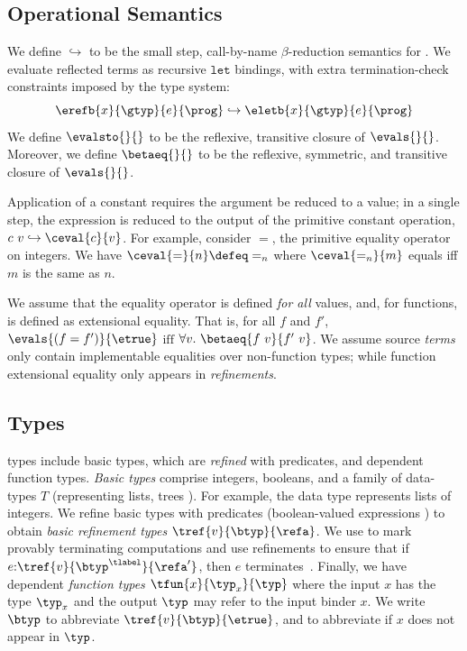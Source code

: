 \subsection{Operational Semantics}
We define $\hookrightarrow$ to be the small step, call-by-name
$\beta$-reduction semantics for \corelan.
%
We evaluate reflected terms %
as recursive $\mathtt{let}$ bindings, with extra termination-check
constraints imposed by the type system:
%
$$
\erefb{x}{\gtyp}{e}{\prog}
\hookrightarrow
\eletb{x}{\gtyp}{e}{\prog}
$$
%
We define $\evalsto{}{}$ to be the reflexive,
transitive closure of $\evals{}{}$.
%
Moreover, we define $\betaeq{}{}$ to be the reflexive,
symmetric, and transitive closure of $\evals{}{}$.

 Application of a constant requires the
argument be reduced to a value; in a single step, the
expression is reduced to the output of the primitive
constant operation, \ie ${c\ v} \hookrightarrow \ceval{c}{v}$.
%
For example, consider $=$, the primitive equality
operator on integers.
%
We have $\ceval{=}{n} \defeq =_n$
where $\ceval{=_n}{m}$ equals \etrue
iff $m$ is the same as $n$.
%

We assume that the equality operator
is defined \emph{for all} values,
and, for functions, is defined as
extensional equality.
%
That is, for all
$f$ and
$f'$,
$\evals{(f = f')}{\etrue}$
   $\mbox{iff}$
  $\forall v.\ \betaeq{f\ v}{f'\ v}$.
%
We assume source \emph{terms} only contain implementable equalities
over non-function types; while function extensional equality only
appears in \emph{refinements}. %


\subsection{Types}

\corelan types include basic types, which are \emph{refined} with predicates,
and dependent function types.
%
\emph{Basic types} \btyp comprise integers, booleans, and a family of data-types
$T$ (representing lists, trees \etc).
%
For example, the data type \tintlist represents lists of integers.
%
We refine basic types with predicates (boolean-valued expressions ) to obtain
\emph{basic refinement types} $\tref{v}{\btyp}{\refa}$.
%
%
We use \tlabel to mark provably terminating
computations and use
refinements to ensure that if
${{e}\text{:}{\tref{v}{\btyp^\tlabel}{\refa'}}}$,
then $e$ terminates~\citep{Vazou14}.
%
Finally, we have dependent \emph{function types} $\tfun{x}{\typ_x}{\typ}$
where the input $x$ has the type $\typ_x$ and the output $\typ$ may
refer to the input binder $x$.
%
We write $\btyp$ to abbreviate $\tref{v}{\btyp}{\etrue}$,
and  to abbreviate  if
$x$ does not appear in $\typ$.
%

